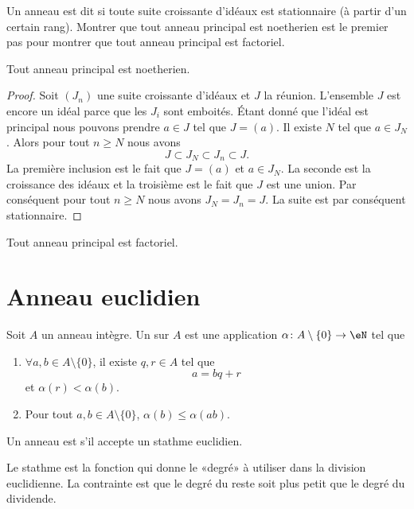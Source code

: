 Un anneau est dit  si toute suite croissante d'idéaux est stationnaire (à partir d'un certain rang). Montrer que tout anneau principal est noetherien est le premier pas pour montrer que tout anneau principal est factoriel.

\begin{lemma}
    Tout anneau principal est noetherien.
\end{lemma}

\begin{proof}
    Soit \( (J_n)\) une suite croissante d'idéaux et \( J\) la réunion. L'ensemble \( J\) est encore un idéal parce que les \( J_i\) sont emboités. Étant donné que l'idéal est principal nous pouvons prendre \( a\in J\) tel que \( J=(a)\). Il existe \( N\) tel que \( a\in J_N\). Alors pour tout \( n\geq N\) nous avons
    \begin{equation}
        J\subset J_N\subset J_n\subset J.
    \end{equation}
    La première inclusion est le fait que \( J=(a)\) et \( a\in J_N\). La seconde est la croissance des idéaux et la troisième est le fait que \( J\) est une union. Par conséquent pour tout \( n\geq N\) nous avons \( J_N=J_n=J\). La suite est par conséquent stationnaire.
\end{proof}

\begin{theorem}
    Tout anneau principal est factoriel.
\end{theorem}

\section{Anneau euclidien}

\begin{definition} \label{DefAXitWRL}
    Soit \( A\) un anneau intègre. Un  sur \( A\) est une application \( \alpha\colon A\setminus\{ 0 \}\to \eN\) tel que
    \begin{enumerate}
        \item
            \( \forall a,b\in A\setminus\{ 0 \}\), il existe \( q,r\in A\) tel que
            \begin{equation}
                a=bq+r
            \end{equation}
            et \( \alpha(r)<\alpha(b)\).
        \item
            Pour tout \( a,b\in A\setminus\{ 0 \}\), \( \alpha(b)\leq \alpha(ab)\).
    \end{enumerate}
    Un anneau est  s'il accepte un stathme euclidien.
\end{definition}
Le stathme est la fonction qui donne le «degré» à utiliser dans la division euclidienne. La contrainte est que le degré du reste soit plus petit que le degré du dividende.

